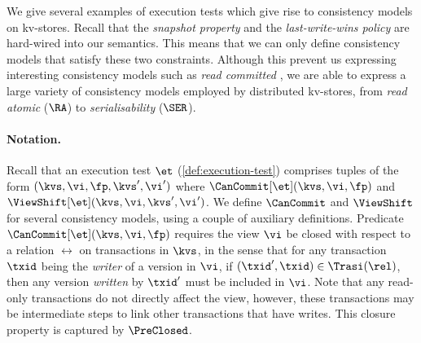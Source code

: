 We give several examples of execution tests which give rise to consistency models on kv-stores.
Recall that the \emph{snapshot property} and the \emph{last-write-wins policy} are hard-wired into our semantics. 
This means that we can only define  consistency models that satisfy these two constraints. 
Although this prevent us expressing interesting consistency models such as \emph{read committed} \citep{si}, 
we are able to express a large variety of consistency models employed by distributed kv-stores,
from \emph{read atomic} (\(\RA\)) to \emph{serialisability} (\(\SER\)).

\paragraph{Notation.} 

Recall that an execution test \(\et\) (\cref{def:execution-test})
comprises tuples of the form \((\kvs,\vi, \fp, \kvs', \vi')\) 
where  \(\CanCommit[\et]( \kvs, \vi, \fp )\) and \(\ViewShift[\et]( \kvs, \vi, \kvs', \vi' )\). 
We define \(\CanCommit\) and \(\ViewShift\) for several consistency models,
using a couple of auxiliary definitions. 
Predicate \(\CanCommit[\et]( \kvs, \vi, \fp ) \) requires the view \( \vi \) be closed
with respect to a relation \( \rel \) on transactions in \( \kvs \),
in the sense that for any transaction \( \txid \) being the \emph{writer} of a version in \( \vi \),
if \( (\txid',\txid) \in \Trasi(\rel) \), then any version \emph{written} by \( \txid' \) must be
included in \( \vi \).
Note that any read-only transactions do not directly affect the view,
however, these transactions may be intermediate steps to link other transactions that have writes.
This closure property is captured by \( \PreClosed \).

